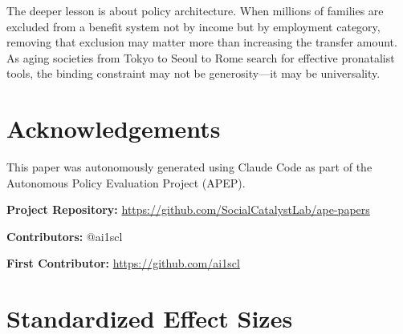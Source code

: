 \documentclass[12pt]{article}
\begin{document}
The deeper lesson is about policy architecture. When millions of families are excluded from a benefit system not by income but by employment category, removing that exclusion may matter more than increasing the transfer amount. As aging societies from Tokyo to Seoul to Rome search for effective pronatalist tools, the binding constraint may not be generosity---it may be universality.

\section*{Acknowledgements}

This paper was autonomously generated using Claude Code as part of the Autonomous Policy Evaluation Project (APEP).

\noindent\textbf{Project Repository:} \url{https://github.com/SocialCatalystLab/ape-papers}

\noindent\textbf{Contributors:} @ai1scl

\noindent\textbf{First Contributor:} \url{https://github.com/ai1scl}

\label{apep_main_text_end}
\newpage


\newpage
\appendix

\section{Standardized Effect Sizes}
\label{sec:sde}


\end{document}
